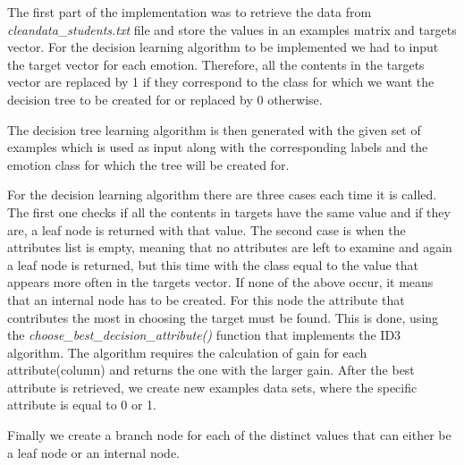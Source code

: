 The first part of the implementation was to retrieve the data from
\emph{cleandata\_students.txt} file and store the values in an examples matrix and targets
vector. For the decision learning algorithm to be implemented we had to input
the target vector for each emotion. Therefore, all the contents in the targets
vector are replaced by 1 if they correspond to the class for which we
want the decision tree to be created for or replaced by 0 otherwise.

The decision tree learning algorithm is then generated with the given set of
examples which is used
as input along with the corresponding labels and the emotion class for which
the tree will be created for.

For the decision learning algorithm there are three cases each time
it is called. The first one checks if all the contents in targets have the same
value and if they are, a leaf node is returned with that value. The second case is
when the attributes list is empty, meaning that no attributes are left to
examine and again a leaf node is returned, but this time with the class equal to
the value that appears more often in the targets vector. If none of the above
occur, it means that an internal node has to be created. For this node the attribute
that contributes the most in choosing the target must be found. This is done,
using the \emph{choose\_best\_decision\_attribute()} function that implements
the ID3 algorithm. The algorithm requires the calculation of gain for each
attribute(column) and returns the one with the larger gain. After the best
attribute is retrieved, we create new examples data sets, where the specific
attribute is equal to 0 or 1.

Finally we create a branch node for each of the
distinct values that can either be a leaf node or an internal node.
